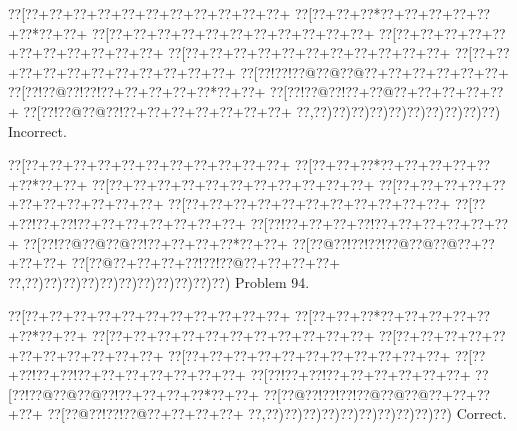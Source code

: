 \documentclass[a5paper]{article}
\begin{document}
\begin{center}
{\goo
\0??[\0??+\0??+\0??+\0??+\0??+\0??+\0??+\0??+\0??+\0??+\0??+
\0??[\0??+\0??+\0??*\0??+\0??+\0??+\0??+\0??+\0??*\0??+\0??+
\0??[\0??+\0??+\0??+\0??+\0??+\0??+\0??+\0??+\0??+\0??+\0??+
\0??[\0??+\0??+\0??+\0??+\0??+\0??+\0??+\0??+\0??+\0??+\0??+
\0??[\0??+\0??+\0??+\0??+\0??+\0??+\0??+\0??+\0??+\0??+\0??+
\0??[\0??+\0??+\0??+\0??+\0??+\0??+\0??+\0??+\0??+\0??+\0??+
\0??[\0??!\0??!\0??@\0??@\0??@\0??+\0??+\0??+\0??+\0??+\0??+
\0??[\0??!\0??@\0??!\0??!\0??+\0??+\0??+\0??+\0??*\0??+\0??+
\0??[\0??!\0??@\0??!\0??+\0??@\0??+\0??+\0??+\0??+\0??+
\0??[\0??!\0??@\0??@\0??!\0??+\0??+\0??+\0??+\0??+\0??+\0??+
\0??,\0??)\0??)\0??)\0??)\0??)\0??)\0??)\0??)\0??)\0??)
}
Incorrect. 

\end{center}
\newpage
\begin{center}
{\goo
\0??[\0??+\0??+\0??+\0??+\0??+\0??+\0??+\0??+\0??+\0??+\0??+
\0??[\0??+\0??+\0??*\0??+\0??+\0??+\0??+\0??+\0??*\0??+\0??+
\0??[\0??+\0??+\0??+\0??+\0??+\0??+\0??+\0??+\0??+\0??+\0??+
\0??[\0??+\0??+\0??+\0??+\0??+\0??+\0??+\0??+\0??+\0??+\0??+
\0??[\0??+\0??+\0??+\0??+\0??+\0??+\0??+\0??+\0??+\0??+\0??+
\0??[\0??+\0??!\0??+\0??!\0??+\0??+\0??+\0??+\0??+\0??+\0??+
\0??[\0??!\0??+\0??+\0??+\0??!\0??+\0??+\0??+\0??+\0??+\0??+
\0??[\0??!\0??@\0??@\0??@\0??!\0??+\0??+\0??+\0??*\0??+\0??+
\0??[\0??@\0??!\0??!\0??!\0??@\0??@\0??@\0??+\0??+\0??+\0??+
\0??[\0??@\0??+\0??+\0??+\0??!\0??!\0??@\0??+\0??+\0??+\0??+
\0??,\0??)\0??)\0??)\0??)\0??)\0??)\0??)\0??)\0??)\0??)\0??)
}
Problem 94.

\end{center}
\begin{center}
{\goo
\0??[\0??+\0??+\0??+\0??+\0??+\0??+\0??+\0??+\0??+\0??+\0??+
\0??[\0??+\0??+\0??*\0??+\0??+\0??+\0??+\0??+\0??*\0??+\0??+
\0??[\0??+\0??+\0??+\0??+\0??+\0??+\0??+\0??+\0??+\0??+\0??+
\0??[\0??+\0??+\0??+\0??+\0??+\0??+\0??+\0??+\0??+\0??+\0??+
\0??[\0??+\0??+\0??+\0??+\0??+\0??+\0??+\0??+\0??+\0??+\0??+
\0??[\0??+\0??!\0??+\0??!\0??+\0??+\0??+\0??+\0??+\0??+\0??+
\0??[\0??!\0??+\0??!\0??+\0??+\0??+\0??+\0??+\0??+
\0??[\0??!\0??@\0??@\0??@\0??!\0??+\0??+\0??+\0??*\0??+\0??+
\0??[\0??@\0??!\0??!\0??!\0??@\0??@\0??@\0??+\0??+\0??+\0??+
\0??[\0??@\0??!\0??!\0??@\0??+\0??+\0??+\0??+
\0??,\0??)\0??)\0??)\0??)\0??)\0??)\0??)\0??)\0??)\0??)
}
Correct. 

\end{center}
\end{document}
